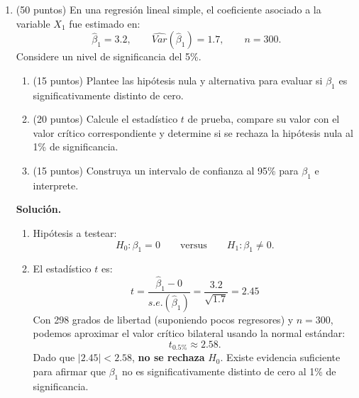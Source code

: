 \documentclass[10pt,a4paper]{article}
\begin{document}
 
\begin{enumerate}

    \item (50 puntos) En una regresión lineal simple, el coeficiente asociado a la variable
        \(X_1\) fue estimado en:
        \[
          \hat\beta_1 = 3.2,
          \qquad \hat{Var}(\hat\beta_1) = 1.7,
          \qquad n = 300.
        \]
        Considere un nivel de significancia del 5\%.

        \begin{enumerate}[label=\alph*)]
          \item (15 puntos) Plantee las hipótesis nula y alternativa para evaluar si
                \( \beta_1 \) es significativamente distinto de cero.
          \item (20 puntos) Calcule el estadístico \( t \) de prueba, compare su valor
                con el valor crítico correspondiente y determine si se
                rechaza la hipótesis nula al 1\% de significancia.
          \item (15 puntos) Construya un intervalo de confianza al 95\% para
                \( \beta_1 \) e interprete.
        \end{enumerate}

        \textbf{Solución.}
        \begin{enumerate}[label=\alph*)]
          \item Hipótesis a testear:
                \[
                  H_0: \beta_1 = 0
                  \qquad\text{versus}\qquad
                  H_1: \beta_1 \neq 0.
                \]
          \item El estadístico \( t \) es:
                \[
                  t
                  = \frac{\hat\beta_1 - 0}{s.e.(\hat\beta_1)}
                  = \frac{3.2}{\sqrt{1.7}}
                  = 2.45
                \]
                Con 298 grados de libertad (suponiendo pocos regresores)
                y \(n = 300\), podemos aproximar el valor crítico bilateral
                usando la normal estándar:
                \[
                  t_{0.5\%} \approx 2.58.
                \]
                Dado que \(|2.45| < 2.58\), \textbf{ no se rechaza} \( H_0 \).
                Existe evidencia suficiente para afirmar que \( \beta_1 \) no es
                significativamente distinto de cero al 1\% de significancia.


\end{enumerate}
\end{enumerate}
\end{document}
